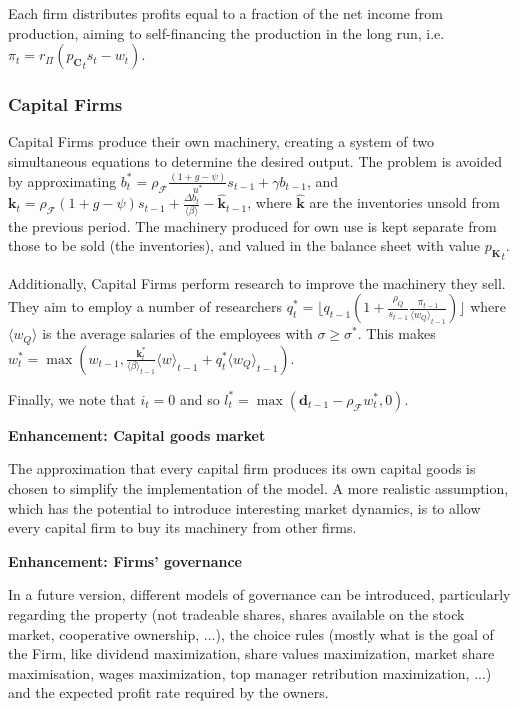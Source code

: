 \documentclass[a4paper, headings=standardclasses]{scrartcl}
\newenvironment{enh}[1][]{\begin{framed}\noindent\textbf{Enhancement: #1}\par}{\end{framed}}
\begin{document}
Each firm distributes profits equal to a fraction of the net income from production, aiming to self-financing the production in the long run, i.e. $\pi_t = r_\Pi ({p_\mathbf{C}}_t s_t - w_t)$.


\subsubsection{Capital Firms}
Capital Firms produce their own machinery, creating a system of two simultaneous equations to determine the desired output.
The problem is avoided by approximating $b^*_t = \rho_\mathcal{F}\frac{(1+g-\psi)}{u^*}s_{t-1} + \gamma b_{t-1}$, and $\mathbf{k}_t = \rho_\mathcal{F}(1+g-\psi)s_{t-1} + \frac{{\Delta b}_t}{\langle \beta \rangle} - \hat{\mathbf{k}}_{t-1}$, where $\hat{\mathbf{k}}$ are the inventories unsold from the previous period. The machinery produced for own use is kept separate from those to be sold (the inventories), and valued in the balance sheet with value ${p_\mathbf{K}}_t$.

Additionally, Capital Firms perform research to improve the machinery they sell. They aim to employ a number of researchers $q_t^* = \lfloor q_{t-1} (1+\frac{\rho_Q}{s_{t-1}}\frac{\pi_{t-1}}{{\langle w_Q \rangle}_{t-1}}) \rfloor$ where $\langle w_Q \rangle$ is the average salaries of the employees with $\sigma \ge \sigma^*$. This makes $w_t^* = \max(w_{t-1}, \frac{\mathbf{k}^*_t}{{\langle \beta \rangle}_{t-1}}{\langle w \rangle}_{t-1} + q_t^* {\langle w_Q \rangle}_{t-1})$.

Finally, we note that $i_t = 0$ and so $l_t^* = \max(\mathbf{d}_{t-1} - \rho_\mathcal{F} w_t^*, 0)$.

\begin{enh}[Capital goods market]
	The approximation that every capital firm produces its own capital goods is chosen to simplify the implementation of the model.
	A more realistic assumption, which has the potential to introduce interesting market dynamics, is to allow every capital firm to buy its machinery from other firms.
\end{enh}

\begin{enh}[Firms' governance]
	In a future version, different models of governance can be introduced, particularly regarding the property (not tradeable shares, shares available on the stock market, cooperative ownership, ...), the choice rules (mostly what is the goal of the Firm, like dividend maximization, share values maximization, market share maximisation, wages maximization, top manager retribution maximization, ...) and the expected profit rate required by the owners.
\end{enh}
\end{document}
